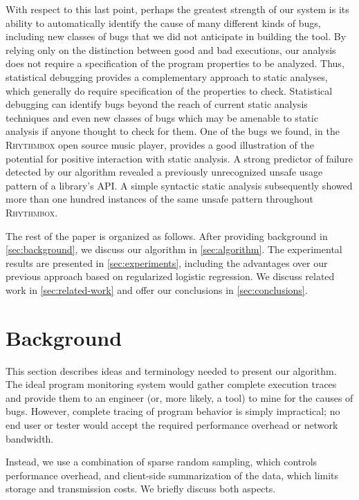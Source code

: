 \documentclass[final]{sigplanconf}
\newcommand{\rhythmbox}{\textsc{Rhythmbox}\xspace}
\begin{document}
With respect to this last point, perhaps the greatest strength of our
system is its ability to automatically identify the cause of many
different kinds of bugs, including new classes of bugs that we did not
anticipate in building the tool.  By relying only on the distinction
between good and bad executions, our analysis does not require a
specification of the program properties to be analyzed.  Thus,
statistical debugging provides a complementary approach to static
analyses, which generally do require specification of the properties
to check.  Statistical debugging can identify bugs beyond the reach of
current static analysis techniques and even new classes of bugs which may be
amenable to static analysis if anyone thought to check for them.
One of the bugs we found, in the \rhythmbox open source music player,
provides a good illustration of the potential for positive interaction
with static analysis.  A strong predictor of failure detected by our
algorithm revealed a previously unrecognized unsafe usage pattern of a
library's API\@.  A simple syntactic static analysis subsequently showed
more than one hundred instances of the same unsafe pattern throughout
\rhythmbox.

The rest of the paper is organized as follows.  After providing background
in \autoref{sec:background}, we discuss our algorithm
in \autoref{sec:algorithm}. The experimental results are presented in
\autoref{sec:experiments}, including the advantages over our
previous approach based on regularized logistic regression.
We discuss related work in \autoref{sec:related-work} and offer our conclusions
in \autoref{sec:conclusions}.


\section{Background}
\label{sec:background}

This section describes ideas and terminology needed to present our
algorithm.  The ideal program monitoring system would gather complete
execution traces and provide them to an engineer (or, more likely, a
tool) to mine for the causes of bugs.  However, complete tracing of
program behavior is simply impractical; no end user or tester would accept the
required performance overhead or network bandwidth.

Instead, we use a combination of sparse random sampling, which controls
performance overhead, and client-side summarization of the data, which
limits storage and transmission costs.  We briefly discuss
both aspects.
\end{document}
